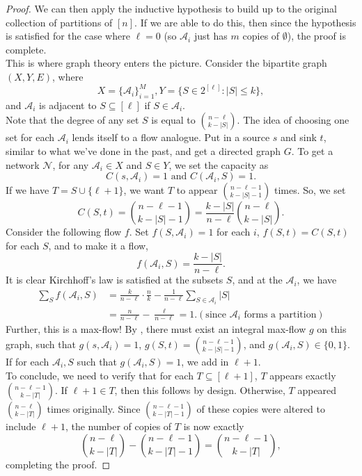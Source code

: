 \begin{proof}
				We can then apply the inductive hypothesis to build up to the original collection of partitions of $[n]$. If we are able to do this, then since the hypothesis is satisfied for the case where $\ell=0$ (so $\mathcal{A}_i$ just has $m$ copies of $\emptyset$), the proof is complete.\\
				This is where graph theory enters the picture. Consider the bipartite graph $(X,Y,E)$, where
				\[ X = \{\mathcal{A}_i\}_{i=1}^M, Y = \{ S \in 2^{[\ell]} : |S| \le k \}, \]
				and $\mathcal{A}_i$ is adjacent to $S\subseteq[\ell]$ if $S \in \mathcal{A}_i$.\\
				Note that the degree of any set $S$ is equal to $\binom{n-\ell}{k-|S|}$.
				The idea of choosing one set for each $\mathcal{A}_i$ lends itself to a flow analogue. Put in a source $s$ and sink $t$, similar to what we've done in the past, and get a directed graph $G$. To get a network $\mathcal{N}$, for any $\mathcal{A}_i\in X$ and $S \in Y$, we set the capacity as
				\[ C(s,\mathcal{A}_i) = 1 \text{ and } C(\mathcal{A}_i, S) = 1. \]
				If we have $T = S \cup \{\ell+1\}$, we want $T$ to appear $\binom{n-\ell-1}{k-|S|-1}$ times. So, we set
				\[ C(S,t) = \binom{n-\ell-1}{k-|S|-1} = \frac{k-|S|}{n-\ell} \binom{n-\ell}{k-|S|}. \]
				Consider the following flow $f$. Set $f(S,\mathcal{A}_i) = 1$ for each $i$, $f(S,t) = C(S,t)$ for each $S$, and to make it a flow,
				\[ f(\mathcal{A}_i, S) = \frac{k-|S|}{n-\ell}. \]
				It is clear Kirchhoff's law is satisfied at the subsets $S$, and at the $\mathcal{A}_i$, we have
				\begin{align*}
					 \sum_S f(\mathcal{A}_i, S) &= \frac{k}{n-\ell} \cdot \frac{n}{k} - \frac{1}{n-\ell} \sum_{S \in \mathcal{A}_i} |S| \\
					 	&= \frac{n}{n-\ell} - \frac{\ell}{n-\ell} = 1. (\text{since $\mathcal{A}_i$ forms a partition})
				\end{align*}
				Further, this is a max-flow! By , there must exist an integral max-flow $g$ on this graph, such that $g(s,\mathcal{A}_i) = 1$, $g(S,t) = \binom{n-\ell-1}{k-|S|-1}$, and $g(\mathcal{A}_i, S) \in \{0,1\}$.\\
				If for each $\mathcal{A}_i,S$ such that $g(\mathcal{A}_i, S) = 1$, we add in $\ell+1$.\\
				To conclude, we need to verify that for each $T \subseteq [\ell+1]$, $T$ appears exactly $\binom{n-\ell-1}{k-|T|}$. If $\ell+1 \in T$, then this follows by design. Otherwise, $T$ appeared $\binom{n-\ell}{k-|T|}$ times originally. Since $\binom{n-\ell-1}{k-|T|-1}$ of these copies were altered to include $\ell+1$, the number of copies of $T$ is now exactly
				\[ \binom{n-\ell}{k-|T|} - \binom{n-\ell-1}{k-|T|-1} = \binom{n-\ell-1}{k-|T|}, \]
				completing the proof.
			\end{proof}

